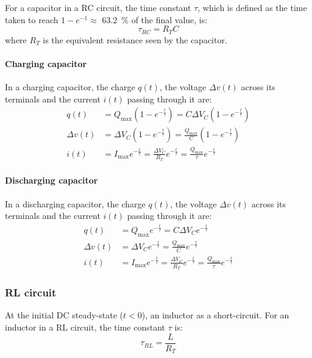 \documentclass[10pt, twocolumn]{article}
\begin{document}
For a capacitor in a RC circuit, the time constant \(\tau\), which is defined as the time taken to reach \(1 - e^{-1} \approx\) \SI{63.2}{\percent} of the final value, is:
\[
  \tau_{RC} = R_T C
\]
where \(R_T\) is the equivalent resistance seen by the capacitor.

\paragraph{Charging capacitor}
In a charging capacitor, the charge \(q(t)\), the voltage \(\Delta v(t)\) across its terminals and the current \(i(t)\) passing through it are:
\begin{align*}
  q(t)        & = Q_\mathrm{max} \left( 1 - e^{-\frac{t}{\tau}} \right) = C \Delta V_C \left( 1 - e^{-\frac{t}{\tau}} \right)                      \\
  \Delta v(t) & = \Delta V_C \left( 1 - e^{-\frac{t}{\tau}} \right) = \frac{Q_\mathrm{max}}{C} \left( 1 - e^{-\frac{t}{\tau}} \right)              \\
  i(t)        & = I_\mathrm{max} e^{-\frac{t}{\tau}} = \frac{\Delta V_C }{R_T}e^{-\frac{t}{\tau}} = \frac{Q_\mathrm{max}}{\tau}e^{-\frac{t}{\tau}}
\end{align*}


\paragraph{Discharging capacitor}
In a discharging capacitor, the charge \(q(t)\), the voltage \(\Delta v(t)\) across its terminals and the current \(i(t)\) passing through it are:
\begin{align*}
  q(t)        & = Q_\mathrm{max} e^{-\frac{t}{\tau}} = C \Delta V_C e^{-\frac{t}{\tau}}                                                              \\
  \Delta v(t) & = \Delta V_C e^{-\frac{t}{\tau}} = \frac{Q_\mathrm{max}}{C} e^{-\frac{t}{\tau}}                                                      \\
  i(t)        & = I_\mathrm{max} e^{-\frac{t}{\tau}} = \frac{\Delta V_C }{R_T} e^{-\frac{t}{\tau}} = \frac{Q_\mathrm{max}}{\tau} e^{-\frac{t}{\tau}}
\end{align*}


\subsubsection{RL circuit}
At the initial DC steady-state (\(t < 0\)), an inductor as a short-circuit.
For an inductor in a RL circuit, the time constant \(\tau\) is:
\[
  \tau_{RL} = \frac{L}{R_T}
\]
\end{document}
